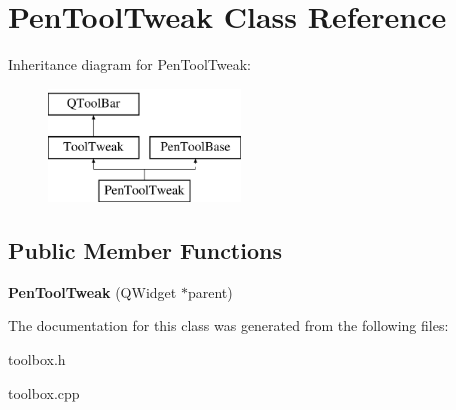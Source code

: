 \hypertarget{class_pen_tool_tweak}{\section{Pen\-Tool\-Tweak Class Reference}
\label{class_pen_tool_tweak}
}
Inheritance diagram for Pen\-Tool\-Tweak\-:\begin{figure}[H]
\begin{center}
\leavevmode
\includegraphics[height=3.000000cm]{class_pen_tool_tweak}
\end{center}
\end{figure}
\subsection*{Public Member Functions}
\begin{DoxyCompactItemize}
\item 
\hypertarget{class_pen_tool_tweak_abed45b54424ce19cb7b8dd73de9233e5}{{\bfseries Pen\-Tool\-Tweak} (Q\-Widget $\ast$parent)}\label{class_pen_tool_tweak_abed45b54424ce19cb7b8dd73de9233e5}

\end{DoxyCompactItemize}


The documentation for this class was generated from the following files\-:\begin{DoxyCompactItemize}
\item 
toolbox.\-h\item 
toolbox.\-cpp\end{DoxyCompactItemize}
